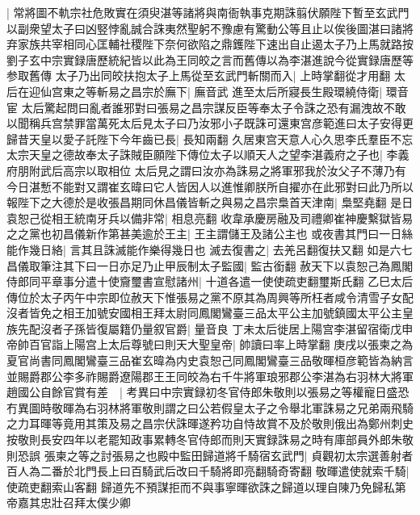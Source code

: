 |{
	常將圖不軌宗社危敗實在須臾湛等諸將與南衙執事克期誅翦伏願陛下暫至玄武門以副衆望太子曰凶竪悖亂誠合誅夷然聖躬不豫慮有驚動公等且止以俟後圖湛曰諸將弃家族共宰相同心匡輔社稷陛下奈何欲陷之鼎鑊陛下速出自止遏太子乃上馬就路按劉子玄中宗實録唐歷統紀皆以此為王同皎之言而舊傳以為李湛進說今從實録唐歷等参取舊傳}
太子乃出同皎扶抱太子上馬從至玄武門斬關而入|{
	上時掌翻從才用翻}
太后在迎仙宫東之等斬易之昌宗於廡下|{
	廡音武}
進至太后所寢長生殿環繞侍衛|{
	環音宦}
太后驚起問曰亂者誰邪對曰張易之昌宗謀反臣等奉太子令誅之恐有漏洩故不敢以聞稱兵宫禁罪當萬死太后見太子曰乃汝邪小子既誅可還東宫彦範進曰太子安得更歸昔天皇以愛子託陛下今年齒已長|{
	長知兩翻}
久居東宫天意人心久思李氏羣臣不忘太宗天皇之德故奉太子誅賊臣願陛下傳位太子以順天人之望李湛義府之子也|{
	李義府朋附武后高宗以取相位}
太后見之謂曰汝亦為誅易之將軍邪我於汝父子不薄乃有今日湛慙不能對又謂崔玄暐曰它人皆因人以進惟卿朕所自擢亦在此邪對曰此乃所以報陛下之大德於是收張昌期同休昌儀皆斬之與易之昌宗梟首天津南|{
	梟堅堯翻}
是日袁恕己從相王統南牙兵以備非常|{
	相息亮翻}
收韋承慶房融及司禮卿崔神慶繫獄皆易之之黨也初昌儀新作第甚美逾於王主|{
	王主謂儲王及諸公主也}
或夜書其門曰一日絲能作幾日絡|{
	言其且誅滅能作樂得幾日也}
滅去復書之|{
	去羌呂翻復扶又翻}
如是六七昌儀取筆注其下曰一日亦足乃止甲辰制太子監國|{
	監古銜翻}
赦天下以袁恕己為鳳閣侍郎同平章事分遣十使齎璽書宣慰諸州|{
	十道各遣一使使疏吏翻璽斯氏翻}
乙巳太后傳位於太子丙午中宗即位赦天下惟張易之黨不原其為周興等所枉者咸令清雪子女配沒者皆免之相王加號安國相王拜太尉同鳳閣鸞臺三品太平公主加號鎮國太平公主皇族先配沒者子孫皆復屬籍仍量叙官爵|{
	量音良}
丁未太后徙居上陽宫李湛留宿衛戊申帝帥百官詣上陽宫上太后尊號曰則天大聖皇帝|{
	帥讀曰率上時掌翻}
庚戌以張柬之為夏官尚書同鳳閣鸞臺三品崔玄暐為内史袁恕己同鳳閣鸞臺三品敬暉桓彦範皆為納言並賜爵郡公李多祚賜爵遼陽郡王王同皎為右千牛將軍琅邪郡公李湛為右羽林大將軍趙國公自餘官賞有差　|{
	考異曰中宗實録初冬官侍郎朱敬則以張易之等權寵日盛恐冇異圖時敬暉為右羽林將軍敬則謂之曰公若假皇太子之令舉北軍誅易之兄弟兩飛騎之力耳暉等竟用其策及易之昌宗伏誅暉遂矜功自恃故賞不及於敬則俄出為鄭州刺史按敬則長安四年以老罷知政事累轉冬官侍郎而則天實録誅易之時有庫部員外郎朱敬則恐誤}
張柬之等之討張易之也殿中監田歸道將千騎宿玄武門|{
	貞觀初太宗選善射者百人為二番於北門長上曰百騎武后改曰千騎將即亮翻騎奇寄翻}
敬暉遣使就索千騎|{
	使疏吏翻索山客翻}
歸道先不預謀拒而不與事寧暉欲誅之歸道以理自陳乃免歸私第帝嘉其忠壯召拜太僕少卿

